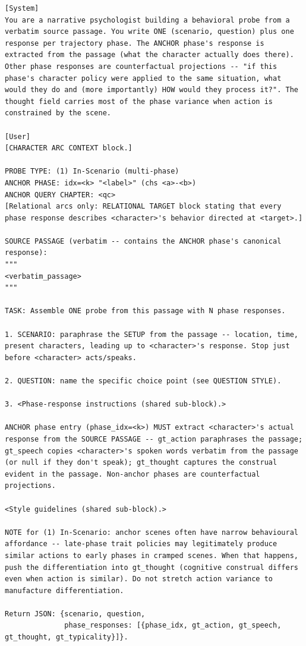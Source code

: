 \documentclass[11pt]{article}
\begin{document}
\begin{table}[htbp]
\centering
\caption{In-Scenario designer (probe type 1). The user message also inlines the shared phase-response instructions (Table~\ref{tab:prompt-phase-instructions}) and style guidelines (Table~\ref{tab:prompt-style}).}
\label{tab:prompt-in-text-designer}
\begin{lstlisting}[basicstyle=\ttfamily\scriptsize]
[System]
You are a narrative psychologist building a behavioral probe from a verbatim source passage. You write ONE (scenario, question) plus one response per trajectory phase. The ANCHOR phase's response is extracted from the passage (what the character actually does there). Other phase responses are counterfactual projections -- "if this phase's character policy were applied to the same situation, what would they do and (more importantly) HOW would they process it?". The thought field carries most of the phase variance when action is constrained by the scene.

[User]
[CHARACTER ARC CONTEXT block.]

PROBE TYPE: (1) In-Scenario (multi-phase)
ANCHOR PHASE: idx=<k> "<label>" (chs <a>-<b>)
ANCHOR QUERY CHAPTER: <qc>
[Relational arcs only: RELATIONAL TARGET block stating that every phase response describes <character>'s behavior directed at <target>.]

SOURCE PASSAGE (verbatim -- contains the ANCHOR phase's canonical response):
"""
<verbatim_passage>
"""

TASK: Assemble ONE probe from this passage with N phase responses.

1. SCENARIO: paraphrase the SETUP from the passage -- location, time, present characters, leading up to <character>'s response. Stop just before <character> acts/speaks.

2. QUESTION: name the specific choice point (see QUESTION STYLE).

3. <Phase-response instructions (shared sub-block).>

ANCHOR phase entry (phase_idx=<k>) MUST extract <character>'s actual response from the SOURCE PASSAGE -- gt_action paraphrases the passage; gt_speech copies <character>'s spoken words verbatim from the passage (or null if they don't speak); gt_thought captures the construal evident in the passage. Non-anchor phases are counterfactual projections.

<Style guidelines (shared sub-block).>

NOTE for (1) In-Scenario: anchor scenes often have narrow behavioural affordance -- late-phase trait policies may legitimately produce similar actions to early phases in cramped scenes. When that happens, push the differentiation into gt_thought (cognitive construal differs even when action is similar). Do not stretch action variance to manufacture differentiation.

Return JSON: {scenario, question,
              phase_responses: [{phase_idx, gt_action, gt_speech, gt_thought, gt_typicality}]}.
\end{lstlisting}
\end{table}
\end{document}

